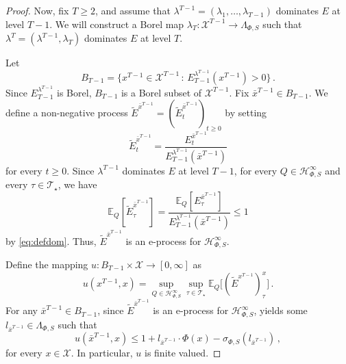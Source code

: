 \documentclass[10pt, a4paper]{article}
\newcommand{\E}{\mathbb E}
\newcommand{\Hh}{\mathcal H}
\newcommand{\HhP}{\Hh_{\Phi,S}}
\newcommand{\LP}{\Lambda_{\Phi,S}}
\newcommand{\sP}{\sigma_{\Phi,S}}
\newcommand{\T}{\mathcal T}
\newcommand{\X}{\mathcal X}
\begin{document}
\begin{proof}
    Now, fix $T\geq2$, and assume that $\lambda^{T-1}=(\lambda_1,\dots,\lambda_{T-1})$ dominates $E$ at level $T-1$. We will construct a Borel map $\lambda_T:\X^{T-1}\to\LP$ such that $\lambda^T=(\lambda^{T-1},\lambda_T)$ dominates $E$ at level $T$.

    

    Let $$B_{T-1} = \{x^{T-1}\in\X^{T-1}\,:\,E_{T-1}^{\lambda^{T-1}}(x^{T-1})>0\}\,.$$
    Since $E^{\lambda^{T-1}}_{T-1}$ is Borel, $B_{T-1}$ is a Borel subset of $\X^{T-1}$. Fix $\bar x^{T-1}\in B_{T-1}$. We define a non-negative process $\tilde E^{\bar x^{T-1}} = (\tilde E_t^{\bar x^{T-1}})_{t\geq 0}$ by setting $$\tilde E^{\bar x^{T-1}}_t = \frac{E^{\bar x^{T-1}}_t}{E^{\lambda^{T-1}}_{T-1}(\bar x^{T-1})}$$
    for every $t\geq 0$. Since $\lambda^{T-1}$ dominates $E$ at level $T-1$, for every $Q\in\HhP^\infty$ and every $\tau\in\T_\star$, we have 
    $$\E_Q[\tilde E_\tau^{\bar x^{T-1}}] = \frac{\E_Q[E_\tau^{\bar x^{T-1}}]}{E_{T-1}^{\lambda^{T-1}}(\bar x^{T-1})}\leq 1$$ by \eqref{eq:defdom}.
    Thus, $\tilde E^{\bar x^{T-1}}$ is an e-process for $\HhP^\infty$. 
    
    Define the mapping $u:B_{T-1}\times\X\to[0,\infty]$ as
    $$u(x^{T-1},x) = \sup_{Q\in\HhP^\infty}\sup_{\tau\in\T_\star}\E_Q\big[(\tilde E^{x^{T-1}})_\tau^{x}]\,.$$
    For any $\bar x^{T-1}\in B_{T-1}$, since $\tilde E^{\bar x^{T-1}}$ is an e-process for $\HhP^\infty$,  yields some $l_{\bar x^{T-1}}\in\LP$ such that \begin{equation}\label{eq:boundu}u(\bar x^{T-1}, x) \leq 1 + l_{\bar x^{T-1}}\cdot\Phi(x) - \sP(l_{\bar x^{T-1}})\,,\end{equation} for every $x\in\X$. In particular, $u$ is finite valued. 


\end{proof}
\end{document}
